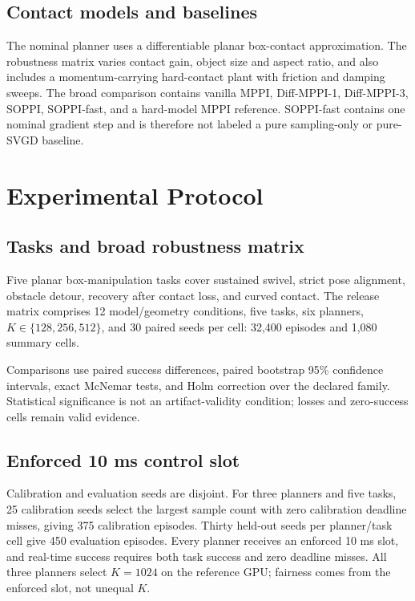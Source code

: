 \documentclass[conference]{IEEEtran}
\begin{document}
\subsection{Contact models and baselines}

The nominal planner uses a differentiable planar box-contact approximation.
The robustness matrix varies contact gain, object size and aspect ratio, and
also includes a momentum-carrying hard-contact plant with friction and damping
sweeps.  The broad comparison contains vanilla MPPI, Diff-MPPI-1,
Diff-MPPI-3, SOPPI, SOPPI-fast, and a hard-model MPPI reference.  SOPPI-fast
contains one nominal gradient step and is therefore not labeled a pure
sampling-only or pure-SVGD baseline.

\section{Experimental Protocol}

\subsection{Tasks and broad robustness matrix}

Five planar box-manipulation tasks cover sustained swivel, strict pose
alignment, obstacle detour, recovery after contact loss, and curved contact.
The release matrix comprises 12 model/geometry conditions, five tasks, six
planners, \(K\in\{128,256,512\}\), and 30 paired seeds per cell: 32,400
episodes and 1,080 summary cells.

Comparisons use paired success differences, paired bootstrap 95\% confidence
intervals, exact McNemar tests, and Holm correction over the declared family.
Statistical significance is not an artifact-validity condition; losses and
zero-success cells remain valid evidence.

\subsection{Enforced 10 ms control slot}

Calibration and evaluation seeds are disjoint.  For three planners and five
tasks, 25 calibration seeds select the largest sample count with zero
calibration deadline misses, giving 375 calibration episodes.  Thirty held-out
seeds per planner/task cell give 450 evaluation episodes.  Every planner
receives an enforced 10 ms slot, and real-time success requires both task
success and zero deadline misses.  All three planners select \(K=1024\) on the
reference GPU; fairness comes from the enforced slot, not unequal \(K\).
\end{document}
